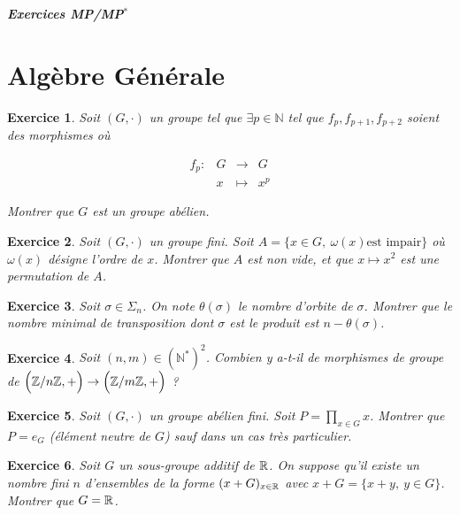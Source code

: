 \documentclass[12pt]{article}
\newtheorem{exercise}{Exercice}[section]
\theoremstyle{remark}
\theoremstyle{remark}
\newcommand{\N}{\mathbb{N}} \newcommand{\Z}{\mathbb{Z}}
\newcommand{\function}[5]{
	$$
	\begin{array}{rccl}
		#1: & #2 & \to & #3 \\
		& #4 & \mapsto & #5
	\end{array}
	$$
}
\begin{document}
\begin{titlepage}
	\centering
	\vspace*{\fill}
	\Huge \textit{\textbf{Exercices MP/MP$^*$}}
	\vspace*{\fill}
\end{titlepage}

\cleardoublepage

\tableofcontents

\cleardoublepage

\section{Algèbre Générale}

\begin{exercise}
	Soit $(G,\cdot)$ un groupe tel que $\exists p\in\N$ tel que
	$f_p,f_{p+1},f_{p+2}$ soient des morphismes où
	\function{f_p}{G}{G}{x}{x^p}
	Montrer que $G$ est un groupe abélien.
\end{exercise}

\begin{exercise}
	Soit $(G,\cdot)$ un groupe fini. Soit $A=\{x\in G,~\omega(x)\text{est
	impair}\}$ où $\omega(x)$ désigne l'ordre de $x$. Montrer que $A$ est non
	vide, et que $x\mapsto x^2$ est une permutation de $A$.
\end{exercise}

\begin{exercise}
	Soit $\sigma\in\Sigma_n$. On note $\theta(\sigma)$ le nombre d'orbite de
	$\sigma$. Montrer que le nombre minimal de transposition dont $\sigma$ est le
	produit est $n-\theta(\sigma)$.
\end{exercise}

\begin{exercise}
	Soit $(n,m)\in(\N^*)^2$. Combien y a-t-il de morphismes de groupe de
	$\Bigl(\Z/n\Z, +\Bigr)\to\Bigl(\Z/m\Z, +\Bigr)$ ?
\end{exercise}

\begin{exercise}
	Soit $(G,\cdot)$ un groupe abélien fini. Soit $P=\prod_{x\in G}x$. Montrer que
	$P=e_{G}$ (élément neutre de $G$) sauf dans un cas très particulier.
\end{exercise}

\begin{exercise}
	Soit $G$ un sous-groupe additif de $\mathbb{R}$. On suppose qu'il existe un nombre
	fini $n$ d'ensembles de la forme $(x+G)_{x\in\mathbb{R}}$ avec $x+G=\{x+y,~y\in G\}$.
	Montrer que $G=\mathbb{R}$.
\end{exercise}
\end{document}

